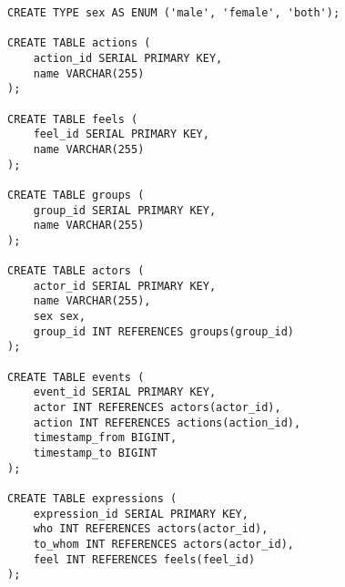 \begin{verbatim}
CREATE TYPE sex AS ENUM ('male', 'female', 'both');

CREATE TABLE actions (
    action_id SERIAL PRIMARY KEY,
    name VARCHAR(255)
);

CREATE TABLE feels (
    feel_id SERIAL PRIMARY KEY,
    name VARCHAR(255)
);

CREATE TABLE groups (
    group_id SERIAL PRIMARY KEY,
    name VARCHAR(255)
);

CREATE TABLE actors (
    actor_id SERIAL PRIMARY KEY,
    name VARCHAR(255),
    sex sex,
    group_id INT REFERENCES groups(group_id)
);

CREATE TABLE events (
    event_id SERIAL PRIMARY KEY,
    actor INT REFERENCES actors(actor_id),
    action INT REFERENCES actions(action_id),
    timestamp_from BIGINT,
    timestamp_to BIGINT
);

CREATE TABLE expressions (
    expression_id SERIAL PRIMARY KEY,
    who INT REFERENCES actors(actor_id),
    to_whom INT REFERENCES actors(actor_id),
    feel INT REFERENCES feels(feel_id)
);
\end{verbatim}

